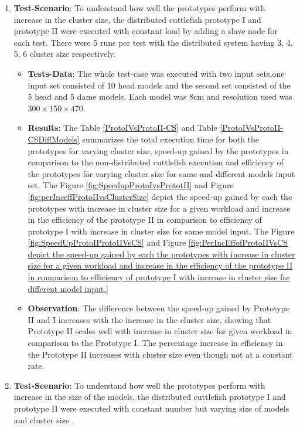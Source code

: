 \begin{enumerate}
\item \textbf{Test-Scenario}: To understand how well the prototypes perform with increase in the cluster size, the distributed cuttlefish prototype I and prototype II were executed with constant load by adding a slave node for each test. There were 5 runs per test with the distributed system having 3, 4, 5, 6 cluster size respectively.
\begin{itemize}
\item \textbf{Tests-Data}: The whole test-case was executed with two input sets,one input set consisted of 10 head models and the second set consisted of the 5 head and 5 dame models. Each model was 8cm and resolution used was \begin{math}300 \times 150 \times 470 \end{math}.  
\item \textbf{Results}: The Table \ref{ProtoIVsProtoII-CS} and Table \ref{ProtoIVsProtoII-CSDiffModels}  summarizes the total execution time for both the prototypes for varying cluster size, speed-up gained by the prototypes in comparison to the non-distributed cuttlefish execution and efficiency of the prototypes for varying cluster size for same and different models input set. The Figure \ref{fig:SpeedupProtoIvsPrototII} and Figure \ref{fig:perInceffProtoIIvsClusterSize} depict the speed-up gained by each the prototypes with increase in cluster size for a given workload and increase in the efficiency of the prototype II in comparison to efficiency of prototype I with increase in cluster size for same model input.  The Figure \ref{fig:SpeedUpProtoIProtoIIVsCS} and Figure \ref{fig:PerIncEffofProtoIIVsCS depict the speed-up gained by each the prototypes with increase in cluster size for a given workload and increase in the efficiency of the prototype II in comparison to efficiency of prototype I with increase in cluster size for different model input.} 
\item \textbf{Observation}: The difference between the speed-up gained by Prototype II and I increases with the increase in the cluster size, showing that Prototype II scales well with increase in cluster size for given workload in comparison to the Prototype I. The percentage increase in efficiency in the Prototype II increases with cluster size even though not at a constant rate. 
\end{itemize}
\item \textbf{Test-Scenario}: To understand how well the prototypes perform with increase in the size of the models, the distributed cuttlefish prototype I and prototype II were executed with constant number but varying size of models and cluster size . 

\end{enumerate}
